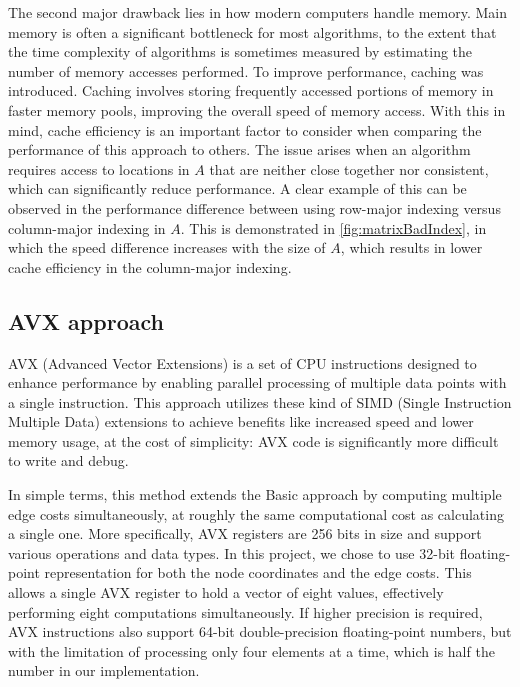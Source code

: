 The second major drawback lies in how modern computers handle memory.
Main memory is often a significant bottleneck for most algorithms, to the extent that the time complexity of algorithms is sometimes measured by estimating the number of memory accesses performed.
To improve performance, caching was introduced.
Caching involves storing frequently accessed portions of memory in faster memory pools, improving the overall speed of memory access.
With this in mind, cache efficiency is an important factor to consider when comparing the performance of this approach to others.
The issue arises when an algorithm requires access to locations in $A$ that are neither close together nor consistent, which can significantly reduce performance.
A clear example of this can be observed in the performance difference between using row-major indexing versus column-major indexing in $A$.
This is demonstrated in \figurename{ \ref{fig:matrixBadIndex}}, in which the speed difference increases with the size of $A$, which results in lower cache efficiency in the column-major indexing.

\subsection{AVX approach}

AVX (Advanced Vector Extensions)\cite{avxWikipedia} is a set of CPU instructions designed to enhance performance by enabling parallel processing of multiple data points with a single instruction.
This approach utilizes these kind of SIMD (Single Instruction Multiple Data) extensions to achieve benefits like increased speed and lower memory usage, at the cost of simplicity: AVX code is significantly more difficult to write and debug.

In simple terms, this method extends the Basic approach by computing multiple edge costs simultaneously, at roughly the same computational cost as calculating a single one.
More specifically, AVX registers are 256 bits in size and support various operations and data types. 
In this project, we chose to use 32-bit floating-point representation for both the node coordinates and the edge costs.
This allows a single AVX register to hold a vector of eight values, effectively performing eight computations simultaneously.
If higher precision is required, AVX instructions also support 64-bit double-precision floating-point numbers, but with the limitation of processing only four elements at a time, which is half the number in our implementation.

